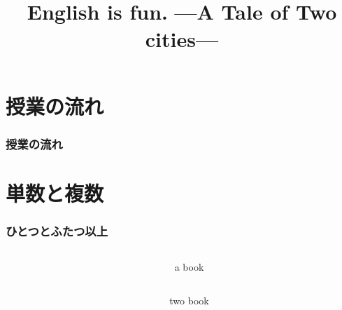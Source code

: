 \documentclass[aspectratio=169]{beamer}
\title{English is fun.\,\,{}---A Tale of Two cities---}
\author{}
\institute[]{}
\date[]
\begin{document}
\begin{frame}[plain]
  \titlepage
\end{frame}

\section*{授業の流れ}
\begin{frame}[plain]
  \frametitle{授業の流れ}
  \tableofcontents
\end{frame}

\section{単数と複数}

\begin{frame}[plain]\frametitle{ひとつとふたつ以上}
\begin{columns}
\begin{column}{.25\textwidth}
\end{column}\pause
\begin{column}{.5\textwidth}\LARGE
a book
\end{column}
\end{columns}

\pause
\begin{columns}
\begin{column}{.25\textwidth}
\end{column}\pause
\begin{column}{.5\textwidth}\LARGE
two book
\end{column}

\end{columns}
\end{frame}
\end{document}
